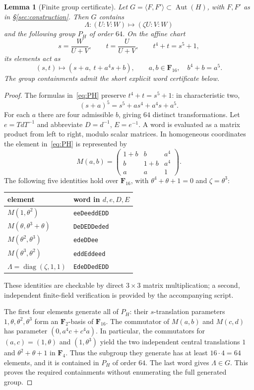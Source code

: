 \documentclass[11pt,a4paper,reqno]{amsart}
\newtheorem{lemma}[theorem]{Lemma}
\newcommand{\FF}{\mathbf F}
\newcommand{\Aut}{\operatorname{Aut}}
\begin{document}
\begin{lemma}[Finite group certificate]\label{lem:certificate}
Let $G=\langle F,F'\rangle\subset\Aut(H)$, with $F,F'$ as in
\S\ref{sec:construction}. Then $G$ contains
\[
 \Lambda:(U:V:W)\longmapsto(\zeta U:V:W)
\]
and the following group $P_H$ of order $64$. On the affine chart
\[
  s=\frac{W}{U+V},\qquad t=\frac{U}{U+V},
  \qquad t^4+t=s^5+1,
\]
its elements act as
\begin{equation}\label{eq:PH}
 (s,t)\longmapsto
 (s+a,\ t+a^4s+b),\qquad
 a,b\in\FF_{16},\quad b^4+b=a^5.
\end{equation}
The group containments admit the short explicit word certificate below.
\end{lemma}
\begin{proof}
The formulas in~\eqref{eq:PH} preserve $t^4+t=s^5+1$:
in characteristic two,
\[
 (s+a)^5=s^5+a s^4+a^4s+a^5.
\]
For each $a$ there are four admissible $b$, giving $64$ distinct
transformations. Let $e=TdT^{-1}$ and abbreviate $D=d^{-1}$,
$E=e^{-1}$. A word is evaluated as a matrix product from left
to right, modulo scalar matrices. In homogeneous coordinates the
element in~\eqref{eq:PH} is represented by
\[
 M(a,b)=\begin{pmatrix}
  1+b&b&a^4\\ b&1+b&a^4\\ a&a&1
 \end{pmatrix}.
\]
The following five identities hold over $\FF_{16}$, with
$\theta^4+\theta+1=0$ and $\zeta=\theta^3$:
\begin{center}
\begin{tabular}{@{}ll@{}}
  element & word in $d,e,D,E$\\\hline
  $M(1,\theta^2)$ & \texttt{eeDeeddEDD}\\
  $M(\theta,\theta^3+\theta)$ & \texttt{DeDEDDeded}\\
  $M(\theta^2,\theta^3)$ & \texttt{edeDDee}\\
  $M(\theta^3,\theta^2)$ & \texttt{eddEddeed}\\
  $\Lambda=\operatorname{diag}(\zeta,1,1)$ & \texttt{EdeDDedEDD}
\end{tabular}
\end{center}
These identities are checkable by direct $3\times3$ matrix
multiplication; a second, independent finite-field verification
is provided by the accompanying script.

The first four elements generate all of $P_H$:
their $s$-translation parameters $1,\theta,\theta^2,\theta^3$
form an $\FF_2$-basis of $\FF_{16}$.
The commutator of $M(a,b)$ and $M(c,d)$ has parameter
$(0,a^4c+c^4a)$.  In particular, the commutators for
$(a,c)=(1,\theta)$ and $(1,\theta^3)$ yield the two
independent central translations $1$ and
$\theta^2+\theta+1$ in $\FF_4$.
Thus the subgroup they generate has at least $16\cdot4=64$
elements, and it is contained in $P_H$ of order $64$.
The last word gives $\Lambda\in G$. This proves the required
containments without enumerating the full generated group.

\end{proof}
\end{document}
